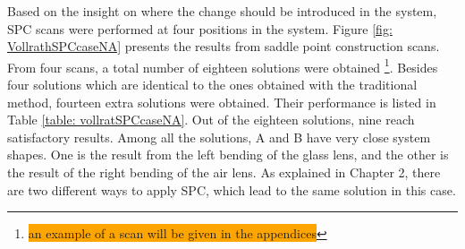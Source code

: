 Based on the insight on where the change should be introduced in the system, SPC scans were performed at four positions in the system. Figure \ref{fig: VollrathSPCcaseNA} presents the results from saddle point construction scans. From four scans, a total number of eighteen solutions were obtained \footnote{\colorbox{orange}{an example of a scan will be given in the appendices}}. Besides four solutions which are identical to the ones obtained with the traditional method, fourteen extra solutions were obtained. Their performance is listed in Table \ref{table: vollratSPCcaseNA}. Out of the eighteen solutions, nine reach satisfactory results. Among all the solutions, A and B have very close system shapes. One is the result from the left bending of the glass lens, and the other is the result of the right bending of the air lens. As explained in Chapter 2, there are two different ways to apply SPC, which lead to the same solution in this case.

\begin{figure}
\end{figure}

